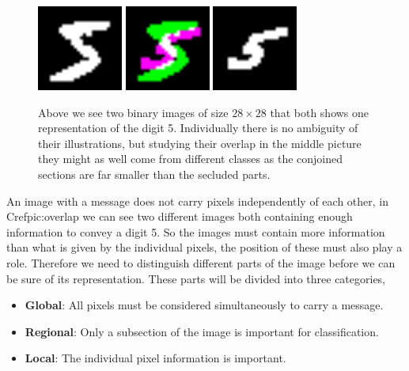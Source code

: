 \begin{figure}[H]
    \centering
    \includegraphics[width=0.25\textwidth]{figure/computer_vision/images/first.png}
    \includegraphics[width=0.25\textwidth]{figure/computer_vision/images/overlap.png}
    \includegraphics[width=0.25\textwidth]{figure/computer_vision/images/second.png}
    \caption{\label{pic:overlap} Above we see two binary images of size $28 \times 28$ that both shows one representation of the digit 5. Individually there is no ambiguity of their illustrations, but studying their overlap in the middle picture they might as well come from different classes as the conjoined sections are far smaller than the secluded parts.}
\end{figure}

An image with a message does not carry pixels independently of each other, in Cref{pic:overlap} we can see two different images both containing enough information to convey a digit 5. So the images must contain more information than what is given by the individual pixels, the position of these must also play a role. Therefore we need to distinguish different parts of the image before we can be sure of its representation. These parts will be divided into three categories,

\begin{itemize}
    \item \textbf{Global}: All pixels must be considered simultaneously to carry a message.
    \item \textbf{Regional}: Only a subsection of the image is important for classification.
    \item \textbf{Local}: The individual pixel information is important.
\end{itemize}

